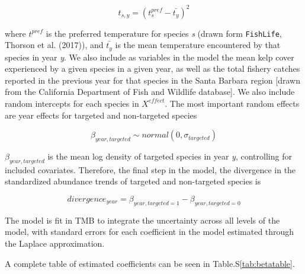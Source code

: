 \documentclass[]{article}
\begin{document}
\begin{equation}
t_{s,y} = (t^{pref}_{s} -  \bar{t_{y}})^2
  \label{eq:tempdev}
\end{equation}

where \(t^{pref}\) is the preferred temperature for species \emph{s} (drawn form \texttt{FishLife}, Thorson et al. (2017)), and \(\bar{t_{y}}\) is the mean temperature encountered by that species in year \emph{y}. We also include as variables in the model the mean kelp cover experienced by a given species in a given year, as well as the total fishery catches reported in the previous year for that species in the Santa Barbara region {[}drawn from the California Department of Fish and Wildlife database{]}. We also include random intercepts for each species in \(X^{effect}\). The most important random effects are year effects for targeted and non-targeted species

\begin{equation}
\beta_{year,targeted} \sim normal(0,\sigma_{targeted})
  \label{eq:betatarg}
\end{equation}

\(\beta_{year,targeted}\) is the mean log density of targeted species in year \emph{y}, controlling for included covariates. Therefore, the final step in the model, the divergence in the standardized abundance trends of targeted and non-targeted species is

\begin{equation}
divergence_{year} =  \beta_{year,targeted = 1} - \beta_{year,targeted = 0}
  \label{eq:mpaeffect}
\end{equation}

The model is fit in TMB to integrate the uncertainty across all levels of the model, with standard errors for each coefficient in the model estimated through the Laplace approximation.

A complete table of estimated coefficients can be seen in Table.S\ref{tab:betatable}.
\end{document}
